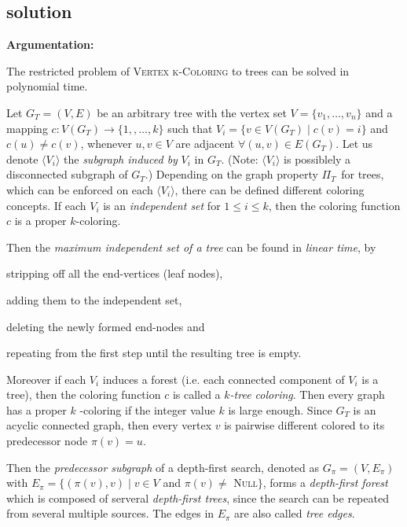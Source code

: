 \subsection{solution}
\noindent \textbf{Argumentation:}

The restricted problem of \textsc{Vertex k-Coloring} to trees can be solved
in polynomial time.

Let $G_{T}=(V,E)$ be an arbitrary tree with the vertex set $V=\{v_{1},\ldots
,v_{n}\}$ and a mapping $c:V(G_{T})\rightarrow \{1,,\ldots ,k\}$ such that $%
V_{i}=\{v\in V(G_{T})\mid c(v)=i\}$ and $c(u)\neq c(v)$, whenever $u,v\in V$
are adjacent $\forall (u,v)\in E(G_{T})$. Let us denote $\langle
V_{i}\rangle $ the \textit{subgraph induced by }$V_{i}$ in $G_{T}.$ (Note: $%
\langle V_{i}\rangle $ is possiblely a disconnected subgraph of $G_{T}$.)
Depending on the graph property $\Pi _{T\text{ }}$for trees, which can be
enforced on each $\langle V_{i}\rangle $, there can be defined different
coloring concepts. If each $V_{i}$ is an \textit{independent set} for $1\leq
i\leq k$, then the coloring function $c$ is a proper $k$-coloring.

Then the \textit{maximum independent set of a tree} can be found in \textit{%
linear time}, by 
\begin{inparaenum}[\itshape 1\upshape)]
\item stripping off all the end-vertices (leaf nodes),
\item adding them to the independent set,
\item deleting the newly formed end-nodes and
\item repeating from the first step until the resulting tree is empty.
\end{inparaenum}Moreover if each $V_{i}$ induces a forest (i.e. each
connected component of $V_{i}$ is a tree), then the coloring function $c$ is
called a $k$\textit{-tree coloring}. Then every graph has a proper $k$%
-coloring if the integer value $k$ is large enough. Since $G_{T}$ is an
acyclic connected graph, then every vertex $v$ is pairwise different colored
to its predecessor node $\pi (v)=u$.

Then the \textit{predecessor subgraph} of a depth-first search, denoted as $%
G_{\pi }=(V,E_{\pi })$ with $E_{\pi }=\{(\pi (v),v)\mid v\in V$ and $\pi
(v)\neq $ \textsc{Null}$\}$, forms a \textit{depth-first forest} which is
composed of serveral \textit{depth-first trees}, since the search can be
repeated from several multiple sources. The edges in $E_{\pi }$ are also
called \textit{tree edges}.

